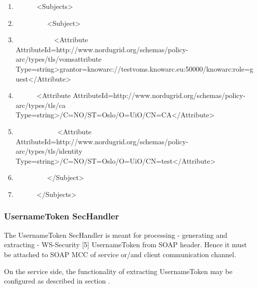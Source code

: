 \documentclass{article}
\newcommand\liststyleWWviiiNumxxiv{%
\renewcommand\theenumi{\arabic{enumi}}
\renewcommand\theenumii{\arabic{enumii}}
\renewcommand\theenumiii{\arabic{enumiii}}
\renewcommand\theenumiv{\arabic{enumiv}}
\renewcommand\labelenumi{\theenumi.}
\renewcommand\labelenumii{\theenumii.}
\renewcommand\labelenumiii{\theenumiii.}
\renewcommand\labelenumiv{\theenumiv.}
}
\begin{document}
\liststyleWWviiiNumxxiv
\begin{enumerate}
\item {\ttfamily\color{black}
\ \ \ \ \ \ {\textless}Subjects{\textgreater}}
\item {\ttfamily\color{black}
\ \ \ \ \ \ \ \ \ {\textless}Subject{\textgreater}}
\item {\ttfamily\color{black}
\ \ \ \ \ \ \ \ \ \ \ {\textless}Attribute
AttributeId={\textquotedbl}http://www.nordugrid.org/schemas/policy-arc/types/tls/vomsattribute{\textquotedbl}
Type={\textquotedbl}string{\textquotedbl}{\textgreater}grantor=knowarc://testvoms.knowarc.eu:50000/knowarc:role=guest{\textless}/Attribute{\textgreater}}
\item {\ttfamily\color{black}
\ \ \ \ \ \ {\textless}Attribute
AttributeId={\textquotedbl}http://www.nordugrid.org/schemas/policy-arc/types/tls/ca{\textquotedbl}
Type={\textquotedbl}string{\textquotedbl}{\textgreater}/C=NO/ST=Oslo/O=UiO/CN=CA{\textless}/Attribute{\textgreater}}
\item {\ttfamily\color{black}
\ \ \ \ \ \ \ \ \ \ \ \ {\textless}Attribute
AttributeId={\textquotedbl}http://www.nordugrid.org/schemas/policy-arc/types/tls/identity{\textquotedbl}
Type={\textquotedbl}string{\textquotedbl}{\textgreater}/C=NO/ST=Oslo/O=UiO/CN=test{\textless}/Attribute{\textgreater}}
\item {\ttfamily\color{black}
\ \ \ \ \ \ \ \ \ {\textless}/Subject{\textgreater}}
\item {\ttfamily\color{black}
\ \ \ \ \ \ {\textless}/Subjects{\textgreater}}
\end{enumerate}

\bigskip

\subsubsection[UsernameToken SecHandler]{UsernameToken SecHandler}
{\color{black}
The UsernameToken SecHandler is meant for processing - generating and
extracting - WS-Security [5] UsernameToken from SOAP header. Hence it
must be attached to SOAP MCC of service or/and client communication
channel. }

{\upshape\color{black}
On the service side, the functionality of extracting UsernameToken may
be configured as described in section . }
\end{document}
